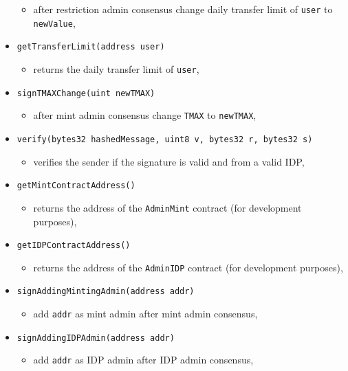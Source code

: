 \documentclass[12pt]{article}
\begin{document}
\begin{itemize}
        \begin{itemize}
            \item[] after restriction admin consensus change daily transfer limit of \texttt{user} to \texttt{newValue},
        \end{itemize}
    \item \texttt{getTransferLimit(address user)}
        \begin{itemize}
            \item[] returns the daily transfer limit of \texttt{user},
        \end{itemize}
    \item \texttt{signTMAXChange(uint newTMAX)}
        \begin{itemize}
            \item[] after mint admin consensus  change \texttt{TMAX} to \texttt{newTMAX},
        \end{itemize}
    \item \texttt{verify(bytes32 hashedMessage, uint8 v, bytes32 r, bytes32 s)}
        \begin{itemize}
            \item[] verifies the sender if the signature is valid and from a valid IDP,
        \end{itemize}
    \item \texttt{getMintContractAddress()}
        \begin{itemize}
            \item[] returns the address of the \texttt{AdminMint} contract (for development purposes),
        \end{itemize}
    \item \texttt{getIDPContractAddress()}
        \begin{itemize}
            \item[] returns the address of the \texttt{AdminIDP} contract (for development purposes),
        \end{itemize}
    \item \texttt{signAddingMintingAdmin(address addr)}
        \begin{itemize}
            \item[] add \texttt{addr} as mint admin after mint admin consensus,
        \end{itemize}
    \item \texttt{signAddingIDPAdmin(address addr)}
        \begin{itemize}
            \item[] add \texttt{addr} as IDP admin after IDP admin consensus,

\end{itemize}
\end{itemize}
\end{document}
